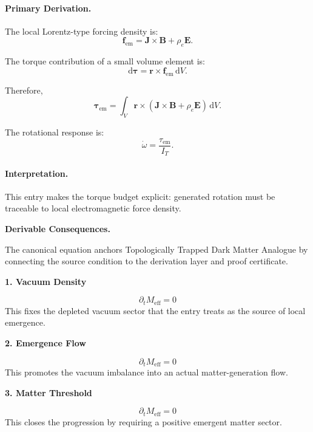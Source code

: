 \paragraph{Primary Derivation.}
The local Lorentz-type forcing density is:
\begin{equation}
\mathbf{f}_{\mathrm{em}}
=
\mathbf{J}\times\mathbf{B}
+
\rho_e\mathbf{E}.
\end{equation}

The torque contribution of a small volume element is:
\begin{equation}
\mathrm{d}\boldsymbol{\tau}
=
\mathbf{r}\times\mathbf{f}_{\mathrm{em}}\,\mathrm{d}V .
\end{equation}

Therefore,
\begin{equation}
\boldsymbol{\tau}_{\mathrm{em}}
=
\int_V
\mathbf{r}\times
\left(
\mathbf{J}\times\mathbf{B}
+
\rho_e\mathbf{E}
\right)
\,\mathrm{d}V .
\end{equation}

The rotational response is:
\begin{equation}
\boxed{
\dot{\omega}
=
\frac{\tau_{\mathrm{em}}}{I_T}.
}
\end{equation}

\paragraph{Interpretation.}
This entry makes the torque budget explicit: generated rotation must be traceable to local electromagnetic force density.

\par\vspace{0.35em}
\noindent\textbf{Derivable Consequences.}\quad
\begingroup
\footnotesize
\raggedright
The canonical equation anchors Topologically Trapped Dark Matter Analogue by connecting the source condition to the derivation layer and proof certificate.
\par\endgroup

\noindent\textbf{1. Vacuum Density}\par
\[
\partial_t M_{\mathrm{eff}}=0
\]
\noindent This fixes the depleted vacuum sector that the entry treats as the source of local emergence.\par
\noindent\textbf{2. Emergence Flow}\par
\[
\partial_t M_{\mathrm{eff}}=0
\]
\noindent This promotes the vacuum imbalance into an actual matter-generation flow.\par
\noindent\textbf{3. Matter Threshold}\par
\[
\partial_t M_{\mathrm{eff}}=0
\]
\noindent This closes the progression by requiring a positive emergent matter sector.\par


